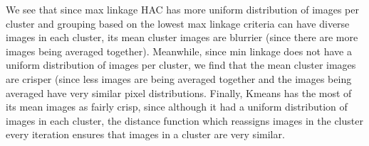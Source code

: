 \documentclass[submit]{harvardml}
\begin{document}
\begin{enumerate}
    We see that since max linkage HAC has more uniform distribution of images per cluster and grouping based on the lowest max linkage criteria can have diverse images in each cluster, its mean cluster images are blurrier (since there are more images being averaged together). Meanwhile, since min linkage does not have a uniform distribution of images per cluster, we find that the mean cluster images are crisper (since less images are being averaged together and the images being averaged have very similar pixel distributions. Finally, Kmeans has the most of its mean images as fairly crisp, since although it had a uniform distribution of images in each cluster, the distance function which reassigns images in the cluster every iteration ensures that images in a cluster are very similar. \\
    

\end{enumerate}
\end{document}
